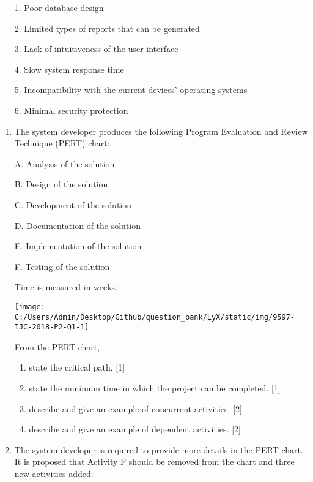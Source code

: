 \noindent %
\noindent\begin{minipage}[t]{1\columnwidth}%
\begin{enumerate}
\item[1.]  Poor database design 
\item[2.]  Limited types of reports that can be generated 
\item[3.]  Lack of intuitiveness of the user interface
\item[4.]  Slow system response time 
\item[5.]  Incompatibility with the current devices\textquoteright{} operating
systems
\item[6.]  Minimal security protection
\end{enumerate}
%
\end{minipage}
\begin{enumerate}
\item The system developer produces the following Program Evaluation and
Review Technique (PERT) chart:

A. Analysis of the solution 

B. Design of the solution 

C. Development of the solution

D. Documentation of the solution 

E. Implementation of the solution

F. Testing of the solution

Time is measured in weeks. \quad{} 
\begin{center}
\texttt{[image: C:/Users/Admin/Desktop/Github/question\_bank/LyX/static/img/9597-IJC-2018-P2-Q1-1]}
\par\end{center}

From the PERT chart, 
\begin{enumerate}
\item state the critical path.\hfill{} {[}1{]}
\item state the minimum time in which the project can be completed. \hfill{}{[}1{]}
\item describe and give an example of concurrent activities. \hfill{}{[}2{]}
\item describe and give an example of dependent activities.\hfill{} {[}2{]}
\end{enumerate}
\item The system developer is required to provide more details in the PERT
chart. It is proposed that Activity F should be removed from the chart
and three new activities added:


\end{enumerate}
